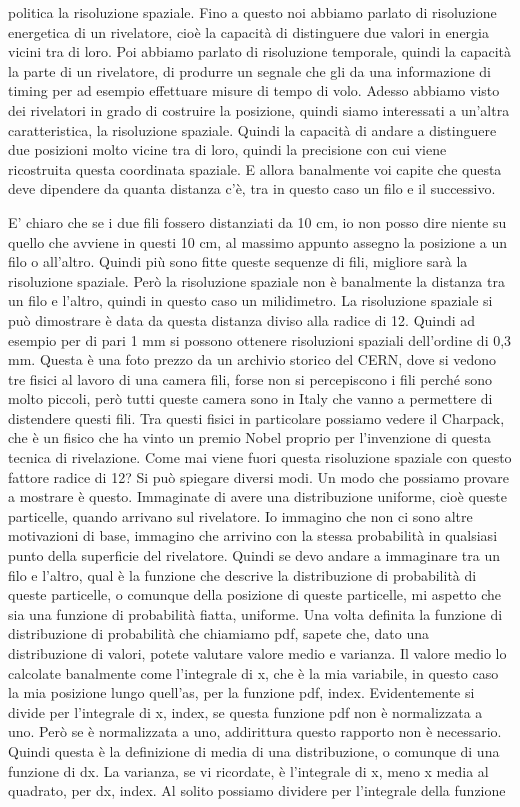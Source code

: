 {politica la risoluzione spaziale. Fino a questo noi abbiamo parlato di risoluzione energetica di un rivelatore, cioè la capacità di distinguere due valori in energia vicini tra di loro. Poi abbiamo parlato di risoluzione temporale, quindi la capacità la parte di un rivelatore, di produrre un segnale che gli da una informazione di timing per ad esempio effettuare misure di tempo di volo. Adesso abbiamo visto dei rivelatori in grado di costruire la posizione, quindi siamo interessati a un'altra caratteristica, la risoluzione spaziale. Quindi la capacità di andare a distinguere due posizioni molto vicine tra di loro, quindi la precisione con cui viene ricostruita questa coordinata spaziale. E allora banalmente voi capite che questa deve dipendere da quanta distanza c'è, tra in questo caso un filo e il successivo. 

E' chiaro che se i due fili fossero distanziati da 10 cm, io non posso dire niente su quello che avviene in questi 10 cm, al massimo appunto assegno la posizione a un filo o all'altro. Quindi più sono fitte queste sequenze di fili, migliore sarà la risoluzione spaziale. Però la risoluzione spaziale non è banalmente la distanza tra un filo e l'altro, quindi in questo caso un milidimetro. La risoluzione spaziale si può dimostrare è data da questa distanza diviso alla radice di 12. Quindi ad esempio per di pari 1 mm si possono ottenere risoluzioni spaziali dell'ordine di 0,3 mm. Questa è una foto prezzo da un archivio storico del CERN, dove si vedono tre fisici al lavoro di una camera fili, forse non si percepiscono i fili perché sono molto piccoli, però tutti queste camera sono in Italy che vanno a permettere di distendere questi fili. Tra questi fisici in particolare possiamo vedere il Charpack, che è un fisico che ha vinto un premio Nobel proprio per l'invenzione di questa tecnica di rivelazione. Come mai viene fuori questa risoluzione spaziale con questo fattore radice di 12? Si può spiegare diversi modi. Un modo che possiamo provare a mostrare è questo. Immaginate di avere una distribuzione uniforme, cioè queste particelle, quando arrivano sul rivelatore. Io immagino che non ci sono altre motivazioni di base, immagino che arrivino con la stessa probabilità in qualsiasi punto della superficie del rivelatore. Quindi se devo andare a immaginare tra un filo e l'altro, qual è la funzione che descrive la distribuzione di probabilità di queste particelle, o comunque della posizione di queste particelle, mi aspetto che sia una funzione di probabilità fiatta, uniforme. Una volta definita la funzione di distribuzione di probabilità che chiamiamo pdf, sapete che, dato una distribuzione di valori, potete valutare valore medio e varianza. Il valore medio lo calcolate banalmente come l'integrale di x, che è la mia variabile, in questo caso la mia posizione lungo quell'as, per la funzione pdf, index. Evidentemente si divide per l'integrale di x, index, se questa funzione pdf non è normalizzata a uno. Però se è normalizzata a uno, addirittura questo rapporto non è necessario. Quindi questa è la definizione di media di una distribuzione, o comunque di una funzione di dx. La varianza, se vi ricordate, è l'integrale di x, meno x media al quadrato, per dx, index. Al solito possiamo dividere per l'integrale della funzione }
